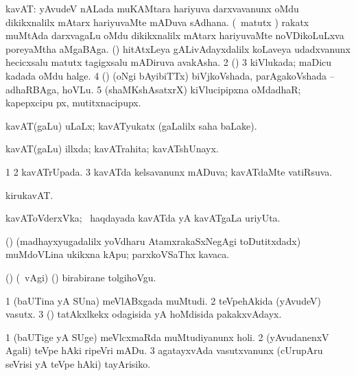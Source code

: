 \bentry
{} 
\gl{\nA}
\expl{}
\bmng
\bnum
{} kavAT: 
\banum
{} yAvudeV nALada muKAMtara hariyuva darxvavanunx oMdu dikikxnalilx mAtarx hariyuvaMte mADuva sAdhana. 
 (\aMrashA\ matutx \pArxvi) rakatx muMtAda darxvagaLu oMdu dikikxnalilx mAtarx hariyuvaMte noVDikoLuLxva poreyaMtha aMgaBAga. 
 (\saM) hitAtxLeya gALivAdayxdalilx koLaveya udadxvanunx hecicxsalu matutx tagigxsalu mADiruva avakAsha. 
\eanum
\numie
\num{2} (\birx)  
\num{3} kiVlukada; maDicu kadada oMdu halge. 
\num{4} (\savi) (oNgi bAyibiTTx) biVjkoVshada, parAgakoVshada -- adhaRBAga, hoVLu. 
\num{5} (shaMKshAsatxrX) kiVlucipipxna oMdadhaR; kapepxcipu px, mutitxnacipupx. 
\enum
\emng
\eentry

\bentry
{} 
\gl{\gu}
\expl{}
\bmng
 kavAT(gaLu) uLaLx; kavATyukatx (\saMpa gaLalilx saha baLake). 
\emng
\eentry

\bentry
{} 
\gl{\gu}
\expl{}
\bmng
 kavAT(gaLu) illxda; kavATrahita; kavATshUnayx. 
\emng
\eentry

\bentry
{} 
\gl{\gu}
\expl{}
\bmng
\bnum
\num{1}  
\num{2} kavATrUpada. 
\num{3} kavATda kelsavanunx mADuva; kavATdaMte vatiRsuva. 
\enum
\emng
\eentry

\bentry
{} 
\gl{\nA}
\expl{}
\bmng
 kirukavAT. 
\emng
\eentry

\bentry
{} 
\gl{\nA}
\expl{}
\bmng
 kavAToVderxVka; \kanmu\ haqdayada kavATda yA kavATgaLa uriyUta. 
\emng
\eentry

\bentry
{} 
\gl{\nA}
\expl{}
\bmng
 (\ca) (madhayxyugadalilx yoVdharu AtamxrakaSxNegAgi toDutitxdadx) muMdoVLina ukikxna kApu; parxkoVSaThx kavaca. 
\emng
\eentry

\bentry
{} 
\gl{\akirx}
\expl{}
\bmng
 (\ame) (\kanmu\ \BAavayx vAgi) (\ashi) birabirane tolgihoVgu. 
\emng
\eentry

\bentry
{} 
\gl{\nA}
\expl{}
\bmng
\bnum
\num{1} (baUTina yA SUna) meVlABxgada muMtudi. 
\num{2} teVpehAkida (yAvudeV) vasutx. 
\num{3} (\saM) tatAkxlkekx odagisida yA hoMdisida pakakxvAdayx. 
\enum
\emng
\eentry

\bentry
{} 
\gl{\sakirx}
\expl{}
\bmng
\bnum
\num{1} (baUTige yA SUge) meVlcxmaRda muMtudiyanunx holi. 
\num{2} (yAvudanenxV Agali) teVpe hAki ripeVri mADu. 
\num{3} agatayxvAda vasutxvanunx (cUrupAru seVrisi yA teVpe hAki) tayArisiko. 
\enum
\emng

